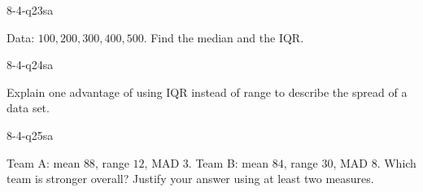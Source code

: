 \begin{practiceQuestion}{8-4-q23}{sa}
\begin{questionText}
Data: $100, 200, 300, 400, 500$. Find the median and the IQR.
\end{questionText}
\end{practiceQuestion}

\begin{practiceQuestion}{8-4-q24}{sa}
\begin{questionText}
Explain one advantage of using IQR instead of range to describe the spread of a data set.
\end{questionText}
\end{practiceQuestion}

\begin{practiceQuestion}{8-4-q25}{sa}
\begin{questionText}
Team A: mean $88$, range $12$, MAD $3$. Team B: mean $84$, range $30$, MAD $8$. Which team is stronger overall? Justify your answer using at least two measures.
\end{questionText}
\end{practiceQuestion}


